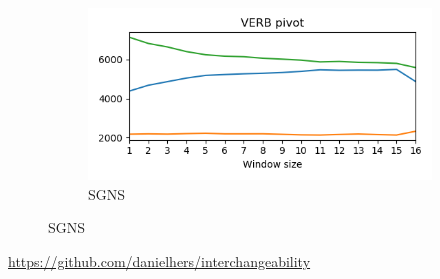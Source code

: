 \documentclass[extrafontsizes,60pt,twocolumn]{memoir}
\begin{document}
\begin{figure}[h]
\begin{subfigure}[c]{.35\columnwidth}
        \includegraphics[width=\columnwidth]{VERB_nn_100_fasttext_enwiki-20170501-clean_skipgram-300d-min500_pos.png}
        \caption{SGNS}
        \end{subfigure}
    \end{figure}

\vfill\hfill
\url{https://github.com/danielhers/interchangeability}


\begin{minipage}{.42\columnwidth}
\color{DarkSlateGray}
\tiny
\setlength\bibitemsep{0pt}


\end{minipage}
\hspace{.3in}
\begin{minipage}{.475\columnwidth}
\color{Black}
\end{minipage}
\end{document}
